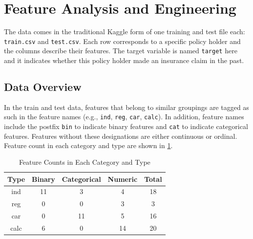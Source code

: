 \documentclass{standalone}
\begin{document}
\section{Feature Analysis and Engineering}

The data comes in the traditional Kaggle form of one training and test file
each: \lstinline{train.csv} and \lstinline{test.csv}. Each row corresponds to a
specific policy holder and the columns describe their features. The target
variable is named \lstinline{target} here and it indicates whether this policy
holder made an insurance claim in the past.

\subsection{Data Overview}

In the train and test data, features that belong to similar groupings are
tagged as such in the feature names (e.g., \lstinline{ind}, \lstinline{reg},
\lstinline{car}, \lstinline{calc}). In addition, feature names include the
postfix \lstinline{bin} to indicate binary features and \lstinline{cat} to
indicate categorical features. Features without these designations are either
continuous or ordinal. Feature count in each category and type are shown in \cref{feature_count}.

\begin{table}[!h]
\renewcommand{\arraystretch}{1.3}
\caption{Feature Counts in Each Category and Type}\label{feature_count}
\centering
\begin{tabular}{c|cccc}
\hline
\bfseries Type & \bfseries  Binary & \bfseries  Categorical & \bfseries  Numeric & \bfseries Total \\ \hline
\ttfamily ind & 11 & 3 & 4 & 18 \\ \hline
\ttfamily reg & 0 & 0 & 3 & 3 \\ \hline
\ttfamily car & 0 & 11 & 5 & 16 \\ \hline
\ttfamily calc & 6 & 0 & 14 & 20 \\ \hline
\end{tabular}

\end{table}
\end{document}
